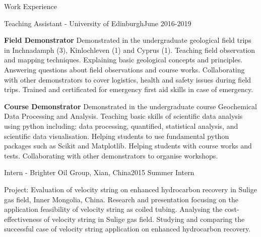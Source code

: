 \documentclass{resume} %
\newenvironment{indentpar}[1]%
  {\begin{list}{}%
          {\setlength{\leftmargin}{#1}}%
          \item[]%
  }
  {\end{list}}
\begin{document}
\begin{rSection}{Work Experience}
\begin{rSubsection}{Teaching Assistant - University of Edinburgh}{June 2016-2019}{}

\begin{indentpar}{0.5cm}
\textbf{Field Demonstrator} Demonstrated in the undergraduate geological field trips in Inchnadamph (3), Kinlochleven (1) and Cyprus (1). Teaching field observation and mapping techniques. Explaining basic geological concepts and principles. Answering questions about field observations and course works. Collaborating with other demonstrators to cover logistics, health and safety issues during field trips. Trained and certificated for emergency first aid skills in case of emergency.

\textbf{Course Demonstrator} Demonstrated in the undergraduate course Geochemical Data Processing and Analysis. Teaching basic skills of scientific data analysis using python including: data processing, quantified, statistical analysis, and scientific data visualisation. Helping students to use fundamental python packages such as Scikit and Matplotlib. Helping students with course works and tests. Collaborating with other demonstrators to organise workshops.
\end{indentpar}

\end{rSubsection}
\begin{rSubsection}{Intern - Brighter Oil Group, Xian, China}{2015 Summer Intern}{}

\begin{indentpar}{0.5cm}
Project: Evaluation of velocity string on enhanced hydrocarbon recovery in Sulige gas field, Inner Mongolia, China. Research and presentation focusing on the application feasibility of velocity string as coiled tubing. Analysing the cost-effectiveness of velocity string in Sulige gas field. Studying and comparing the successful case of velocity string application on enhanced hydrocarbon recovery.
\end{indentpar}

\end{rSubsection}
\end{rSection}
\end{document}
